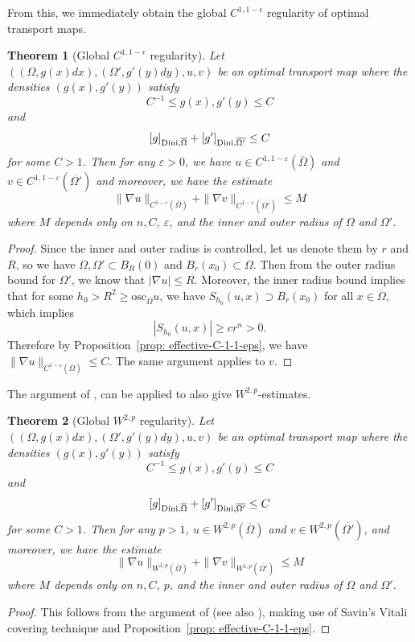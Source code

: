 \documentclass[12pt,reqno]{amsart}
\newtheorem{theorem}{Theorem}[section]
\newcommand{\eps}{\varepsilon}
\numberwithin{equation}{section}
\begin{document}
	From this, we immediately obtain the global $C^{1, 1-\epsilon}$ regularity of optimal transport maps. 
	\begin{theorem}[Global $C^{1, 1-\epsilon}$ regularity]\label{thm: global-C-1-1-eps-regularity}
		Let $((\Omega, g(x)dx), (\Omega', g'(y)dy), u, v)$ be an optimal transport map where the densities $(g(x), g'(y))$ satisfy
	    \[C^{-1}\leq g(x), g'(y)\leq C\]
    	   and
	    \[[g]_{{\rm Dini}, \overline{\Omega}}+[g']_{{\rm Dini}, \overline{\Omega'}}\leq C\]
            for some $C>1$. Then for any $\eps>0$, we have $u\in C^{1, 1-\eps}(\overline\Omega)$ and $v\in C^{1, 1-\eps}(\overline{\Omega'})$ and moreover, we have the estimate
        \[\|\nabla u\|_{C^{1-\eps}(\overline\Omega)}+\|\nabla v\|_{C^{1-\eps}(\overline{\Omega'})}\leq M\]
        where $M$ depends only on $n, C$, $\eps$, and the inner and outer radius of $\Omega$ and $\Omega'$. 
	\end{theorem}
	\begin{proof}
            Since the inner and outer radius is controlled, let us denote them by $r$ and $R$, so we have $\Omega, \Omega'\subset B_R(0)$ and $B_r(x_0)\subset \Omega$. Then from the outer radius bound for $\Omega'$, we know that $|\nabla u|\leq R$. Moreover, the inner radius bound implies that for some $h_0>R^2\geq \text{osc}_{\overline\Omega} u$, we have $S_{h_0}(u, x)\supset B_r(x_0)$ for all $x\in\overline\Omega$, which implies
            \[|S_{h_0}(u, x)|\geq cr^n>0.\]
            Therefore by Proposition~\ref{prop: effective-C-1-1-eps}, we have $\|\nabla u\|_{C^{1-\eps}(\overline{\Omega})}\leq C$. The same argument applies to $v$. 
	\end{proof}
        The argument of \cite[Theorem 1.2]{Chen-Liu-Wang}, \cite[Theorem 1.1]{Savin-Yu} can be applied to also give $W^{2, p}$-estimates. 
	\begin{theorem}[Global $W^{2, p}$ regularity]\label{thm: global-W-2-p-regularity}
		Let $((\Omega, g(x)dx), (\Omega', g'(y)dy), u, v)$ be an optimal transport map where the densities $(g(x), g'(y))$ satisfy
	    \[C^{-1}\leq g(x), g'(y)\leq C\]
    	   and
	    \[[g]_{{\rm Dini}, \overline{\Omega}}+[g']_{{\rm Dini}, \overline{\Omega'}}\leq C\]
            for some $C>1$. Then for any $p>1$, $u\in W^{2, p}(\overline\Omega)$ and $v\in W^{2, p}(\overline{\Omega'})$, and moreover, we have the estimate
        \[\|\nabla u\|_{W^{1, p}(\overline\Omega)}+\|\nabla v\|_{W^{1, p}(\overline{\Omega'})}\leq M\]
        where $M$ depends only on $n, C$, $p$, and the inner and outer radius of $\Omega$ and $\Omega'$. 
	\end{theorem}
        \begin{proof}
            This follows from the argument of  \cite[Theorem 1.2]{Chen-Liu-Wang} (see also \cite[Theorem 1.1]{Savin-Yu}), making use of Savin's Vitali covering technique \cite{Savin} and Proposition~\ref{prop: effective-C-1-1-eps}. 
        \end{proof}
\end{document}
